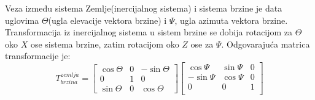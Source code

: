 Veza između sistema Zemlje(inercijalnog sistema) i sistema brzine je data uglovima $\Theta$(ugla elevacije vektora brzine)
i $\Psi$, ugla azimuta vektora brzine. Transformacija iz inercijalnog sistema u sistem brzine se dobija rotacijom 
za $\Theta$ oko $X$ ose sistema brzine, zatim rotacijom oko $Z$ ose za $\Psi$. Odgovarajuća matrica transformacije je:
\begin{equation}
    T_{brzina}^{zemlja} = \begin{bmatrix}
        \cos\Theta & 0 & -\sin\Theta \\
        0& 1& 0\\
        \sin\Theta & 0 & \cos\Theta
    \end{bmatrix}
    \begin{bmatrix}
        \cos\Psi & \sin\Psi & 0\\
        -\sin\Psi & \cos\Psi & 0\\
        0 & 0& 1\\
    \end{bmatrix}
\end{equation}
